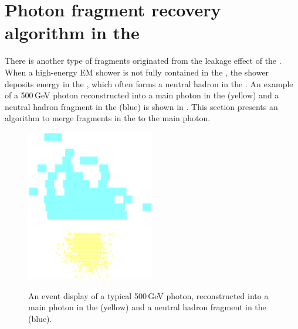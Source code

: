 \begin{table}[htbp]
\caption[The cuts for photon fragment removal algorithm in the \ECAL.]%
{The cuts for merging photon$-$photon-fragment pairs and photon$-$neutral-hadron-fragment pairs for both low energy and high energy fragments, immediately after photon reconstruction. Variables $d$, $d_c$ and $d_h$ are the mean energy weighted intra-layer distance of the pair, the distance between centroids, the minimum distance between calorimeter hits of the pair, respectively. Variables $E_m$ and $E_f$ are the main photon energy and the fragment energy, respectively. Variables $E_{p1}$ and $E_{p2}$ are the energies the two largest peaks, found by \peakFinding algorithm, ordered by descending energy, respectively. $N_{calo}$ is the number of the calorimeter hits in the fragment.}
\label{tab:photonFragRemovalCuts2}
\end{table}


\section{Photon fragment recovery algorithm in the \HCAL}
\label{sec:photonHighEFragRemoval}


There is another type of fragments originated from the leakage effect of the \ECAL. When a high-energy EM shower is not fully contained in the \ECAL, the shower deposits energy in the \HCAL, which often forms a neutral hadron in the \HCAL. An example of a 500\,GeV photon reconstructed into a main photon in the \ECAL (yellow) and a neutral hadron fragment in the \HCAL (blue) is shown in . This section presents an algorithm to merge fragments in the \HCAL to the main photon.



\begin{figure}[tbph]
\centering
{\includegraphics[width=0.5\textwidth]{photon/hcalfrag}}%
\caption{An event display of a typical 500\,GeV photon, reconstructed into a main photon in the \ECAL (yellow) and a neutral hadron fragment in the \HCAL (blue).}
\label{fig:photonEvtDspHCalFrag}
\end{figure}

